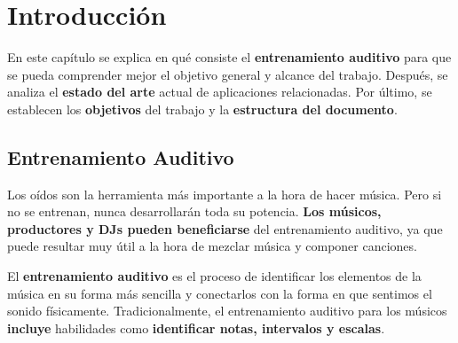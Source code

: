 \documentclass[12pt,twoside,titlepage]{report}
\begin{document}
  


\pagestyle{fancy}
\renewcommand{\chaptermark}[1]{\markboth{Capítulo \thechapter.\ #1}{}}
\pagestyle{fancy}
\fancyhf{}
\fancyhead[LO]{\leftmark}
\fancyhead[RO]{}
\fancyhead[RE]{\nouppercase\rightmark}
\fancyhead[LE]{}
\fancyfoot[C]{\thepage}


   


\chapter{Introducción}

En este capítulo se explica en qué consiste el \textbf{entrenamiento auditivo} para que se pueda comprender mejor el objetivo general y alcance del trabajo. Después, se analiza el \textbf{estado del arte} actual de aplicaciones relacionadas. Por último, se establecen los \textbf{objetivos} del trabajo y la \textbf{estructura del documento}.

\pagestyle{fancy}

\setlength{\parskip}{0.75em}
\renewcommand{\baselinestretch}{1.25}


\setcounter{page}{1}

\section{Entrenamiento Auditivo}

Los oídos son la herramienta más importante a la hora de hacer música. Pero si no se entrenan, nunca desarrollarán toda su potencia. \textbf{Los músicos, productores y DJs pueden beneficiarse} del entrenamiento auditivo, ya que puede resultar muy útil a la hora de mezclar música y componer canciones.

El \textbf{entrenamiento auditivo} es el proceso de identificar los elementos de la música en su forma más sencilla y conectarlos con la forma en que sentimos el sonido físicamente. Tradicionalmente, el entrenamiento auditivo para los músicos \textbf{incluye} habilidades como \textbf{identificar notas, intervalos y escalas}. 
\end{document}
